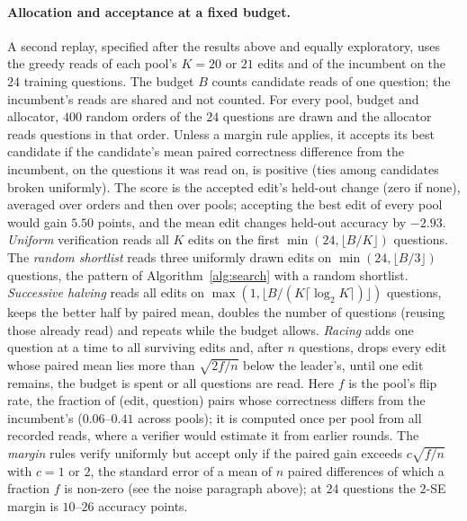 \paragraph{Allocation and acceptance at a fixed budget.} A second replay, specified after the
results above and equally exploratory, uses the greedy reads of each pool's $K=20$ or $21$ edits
and of the incumbent on the $24$ training questions. The budget $B$ counts candidate reads of one
question; the incumbent's reads are shared and not counted. For every pool, budget and allocator,
$400$ random orders of the $24$ questions are drawn and the allocator reads questions in that
order. Unless a margin rule applies, it accepts its best candidate if the candidate's mean paired
correctness difference from the incumbent, on the questions it was read on, is positive (ties among
candidates broken uniformly). The score is the accepted edit's held-out change (zero if none),
averaged over orders and then over pools; accepting the best edit of every pool would gain $5.50$
points, and the mean edit changes held-out accuracy by $-2.93$. \emph{Uniform} verification reads
all $K$ edits on the first $\min(24,\lfloor B/K\rfloor)$ questions. The \emph{random shortlist}
reads three uniformly drawn edits on $\min(24,\lfloor B/3\rfloor)$ questions, the pattern of
Algorithm~\ref{alg:search} with a random shortlist. \emph{Successive halving} reads all edits on
$\max(1,\lfloor B/(K\lceil\log_2K\rceil)\rfloor)$ questions, keeps the better half by paired mean,
doubles the number of questions (reusing those already read) and repeats while the budget allows.
\emph{Racing} adds one question at a time to all surviving edits and, after $n$ questions, drops
every edit whose paired mean lies more than $\sqrt{2f/n}$ below the leader's, until one edit
remains, the budget is spent or all questions are read. Here $f$ is the pool's flip rate, the
fraction of (edit, question) pairs whose correctness differs from the incumbent's ($0.06$--$0.41$
across pools); it is computed once per pool from all recorded reads, where a verifier would
estimate it from earlier rounds. The
\emph{margin} rules verify uniformly but accept only if the paired gain exceeds $c\sqrt{f/n}$ with
$c=1$ or $2$, the standard error of a mean of $n$ paired differences of which a fraction $f$ is
non-zero (see the noise paragraph above); at $24$ questions the $2$-SE margin is $10$--$26$ accuracy points.

\begin{table}[h]
\centering
\caption{\textbf{Held-out change (points) realized by one verification step at a fixed budget}
(exploratory; 11 pools, 400 question orders each). $B$: candidate reads of one question, the
incumbent's reads not counted. Rows per edit: training questions read per edit, $\lfloor
B/K\rfloor$ for $K=20$--$21$ edits, at most $24$. Margin rules: uniform verification, accepting only if the paired gain exceeds $1$ or $2$
standard errors $\sqrt{f/n}$. Best edit of each pool: $+5.50$; mean edit: $-2.93$.}
\label{tab:margin}
\small

\end{table}

